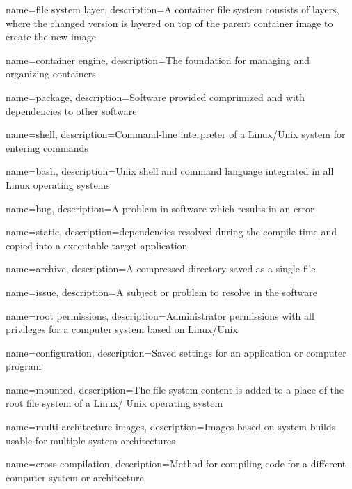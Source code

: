 {
    name={file system layer},
    description={A container file system consists of layers, where the changed version is layered on top of the parent container image to create the new image}
}

{
    name={container engine},
    description={The foundation for managing and organizing containers}
}

{
    name={package},
    description={Software provided comprimized and with dependencies to other software}
}

{
    name={shell},
    description={Command-line interpreter of a Linux/Unix system for entering commands}
}

{
    name={bash},
    description={Unix shell and command language integrated in all Linux operating systems}
}

{
    name={bug},
    description={A problem in software which results in an error}
}

{
    name={static},
    description={dependencies resolved during the compile time and copied into a executable target application}
}

{
    name={archive},
    description={A compressed directory saved as a single file}
}

{
    name={issue},
    description={A subject or problem to resolve in the software}
}

{
    name={root permissions},
    description={Administrator permissions with all privileges for a computer system based on Linux/Unix}
}

{
    name={configuration},
    description={Saved settings for an application or computer program}
}

{
    name={mounted},
    description={The file system content is added to a place of the root file system of a Linux/ Unix operating system}
}

{
    name={multi-architecture images},
    description={Images based on system builds usable for multiple system architectures}
}

{
    name={cross-compilation},
    description={Method for compiling code for a different computer system or architecture}
}

